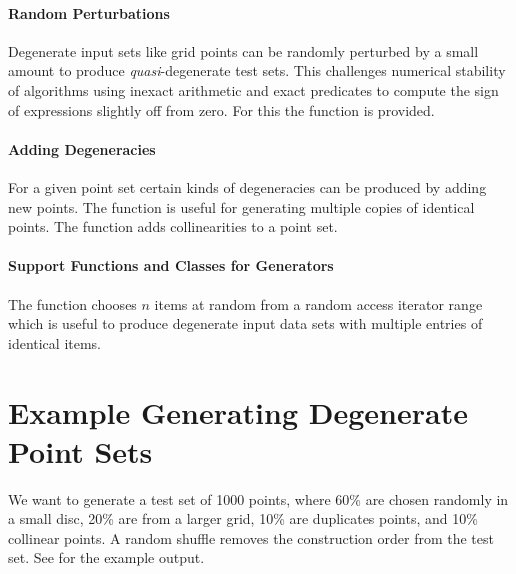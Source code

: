 \paragraph{Random Perturbations}

Degenerate input sets like grid points can be randomly perturbed by a
small amount to produce {\em quasi}-degenerate test sets. This
challenges numerical stability of algorithms using inexact arithmetic and
exact predicates to compute the sign of expressions slightly off from zero.
For this the function  is provided.

\paragraph{Adding Degeneracies}
\ccModifierCrossRefOff
{}
\ccModifierCrossRefOn

For a given point set certain kinds of degeneracies can be produced
by adding new points. The  function is
useful for generating multiple copies of identical points.
The function  adds collinearities to
a point set.

\paragraph{Support Functions and Classes for Generators}

The function  chooses $n$ items at random from a random
access iterator range which is useful to produce degenerate input data
sets with multiple entries of identical items.

\section{Example Generating Degenerate Point Sets}

We want to generate a test set of 1000 points, where 60\% are chosen
randomly in a small disc, 20\% are from a larger grid, 10\% are duplicates
points, and 10\% collinear points. A random shuffle removes the
construction order from the test set. See  for the example output.


